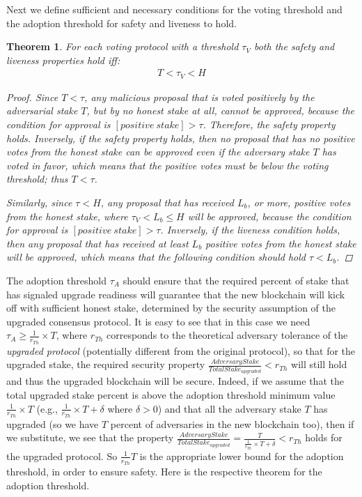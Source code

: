 \documentclass[11pt,a4paper]{article}
\newtheorem{proof}{Proof}
\newtheorem{theorem}{Theorem}
\begin{document}
Next we define sufficient and necessary conditions for the voting threshold and
the adoption threshold for safety and liveness to hold.
\begin{theorem}\label{th:safety_and_liveness_condition_voting}
	For each voting protocol with a threshold $\tau_V$ both the safety and
  liveness properties hold iff:
	\begin{align*}
		T < \tau_V < H
	\end{align*}
	\begin{proof}
		Since $T < \tau$, any malicious proposal that is voted positively by the
    adversarial stake $T$, but by no honest stake at all, cannot be approved,
    because the condition for approval is $[positive\ stake] > \tau$. Therefore,
    the safety property holds. Inversely, if the safety property holds, then no
    proposal that has no positive votes from the honest stake can be approved
    even if the adversary stake $T$ has voted in favor, which means that the
    positive votes must be below the voting threshold; thus $T < \tau$.

		Similarly, since $\tau < H$, any proposal that has received $L_b$, or more,
    positive votes from the honest stake, where $ \tau_V < L_b \leq H$ will be
    approved, because the condition for approval is $[positive\ stake] > \tau$.
    Inversely, if the liveness condition holds, then any proposal that has
    received at least $L_b$ positive votes from the honest stake will be
    approved, which means that the following condition should hold $\tau < L_b$.
	\end{proof}
\end{theorem}

The adoption threshold $\tau_A$ should ensure that the required percent of stake
that has signaled upgrade readiness will guarantee that the new blockchain will
kick off with sufficient honest stake, determined by the security assumption of
the upgraded consensus protocol. It is easy to see that in this case we need
$\tau_A \geq \frac{1}{r_{Th}} \times T$, where $r_{Th}$ corresponds to the
theoretical adversary tolerance of the \emph{upgraded protocol} (potentially
different from the original protocol), so that for the upgraded stake, the
required security property
$\frac{AdversaryStake}{TotalStake_{upgraded}} < r_{Th}$ will still hold and thus
the upgraded blockchain will be secure. Indeed, if we assume that the total
upgraded stake percent is above the adoption threshold minimum value
$\frac{1}{r_{Th}} \times T$ (e.g., $\frac{1}{r_{Th}} \times T + \delta$ where
$\delta > 0$) and that all the adversary stake $T$ has upgraded (so we have $T$
percent of adversaries in the new blockchain too), then if we substitute, we see
that the property
$\frac{AdversaryStake}{TotalStake_{upgraded}} = \frac{T}{\frac{1}{r_{Th}} \times
  T + \delta} < r_{Th}$ holds for the upgraded protocol. So $\frac{1}{r_{Th}} T$
is the appropriate lower bound for the adoption threshold, in order to ensure
safety. Here is the respective theorem for the adoption threshold.
\end{document}
